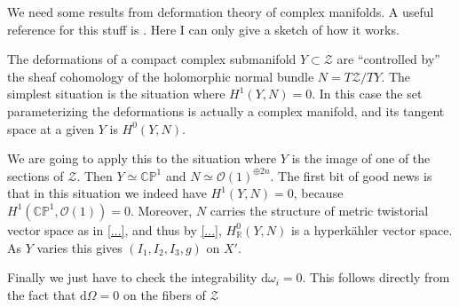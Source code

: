\documentclass[12pt,letterpaper,reqno]{article}
\numberwithin{equation}{section}
\newcommand{\cZ}{\ensuremath{\mathcal Z}}
\newcommand{\cO}{\ensuremath{\mathcal O}}
\newcommand{\R}{\ensuremath{\mathbb R}}
\newcommand{\C}{\ensuremath{\mathbb C}}
\newcommand{\PP}{\ensuremath{\mathbb P}}
\newcommand{\hk}{hyperk\"ahler\xspace}
\newcommand{\de}{\mathrm{d}}
\newcommand{\ti}[1]{\textit{#1}}
\newcommand{\fixme}[1]{{\color{orange}{[#1]}}}
\begin{document}
\begin{pf} We need some results from deformation theory of 
complex manifolds. A useful reference for this stuff is
\cite{MR2093043}. Here I can only give a sketch of how it works.

The deformations of a compact complex submanifold $Y \subset \cZ$
are ``controlled by'' the sheaf cohomology of the 
holomorphic normal bundle $N = T\cZ / TY$.
The simplest situation is the situation where $H^1(Y,N) = 0$.
In this case the set parameterizing the deformations is 
actually a complex manifold, and its tangent space at a given 
$Y$ is $H^0(Y,N)$. 

We are going to apply this to the situation
where $Y$ is the image of one of the sections of $\cZ$.
Then $Y \simeq \C\PP^1$ and $N \simeq \cO(1)^{\oplus 2n}$.
The first bit of good 
news is that in this situation we indeed have $H^1(Y,N) = 0$,
because $H^1(\C\PP^1, \cO(1)) = 0$.
Moreover, $N$ carries the structure of metric
twistorial vector space as in \autoref{...}, and thus by
\autoref{...}, $H^0_\R(Y,N)$ is a \hk vector space.
As $Y$ varies this gives $(I_1,I_2,I_3,g)$ on $X'$.

Finally we just have to check the integrability $\de \omega_i = 0$. 
This follows directly from the fact that $\de \Omega = 0$ 
on the fibers of $\cZ$ \fixme{...}
\end{pf}





\end{document}
